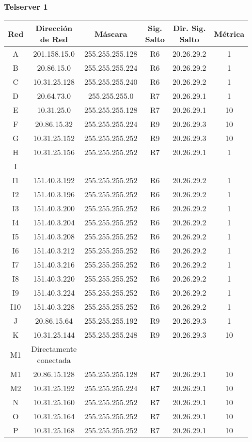 \subsubsection{Telserver 1}
\begin{tabular}{|c|c|c|c|c|c|}
	\hline
	Red & Dirección de Red & Máscara & Sig. Salto & Dir. Sig. Salto & Métrica \\
	\hline
	A & 201.158.15.0  & 255.255.255.128 & R6 & 20.26.29.2 & 1\\
	\hline	
	B & 20.86.15.0 & 255.255.255.224 & R6 & 20.26.29.2 & 1\\
	\hline
	C & 10.31.25.128 & 255.255.255.240 & R6 & 20.26.29.2 & 1\\
	\hline
	D & 20.64.73.0 & 255.255.255.0 & R7 & 20.26.29.1 & 1\\
	\hline
	E & 10.31.25.0 & 255.255.255.128 & R7 & 20.26.29.1 & 10\\
	\hline
	F & 20.86.15.32 & 255.255.255.224 & R9 & 20.26.29.3 & 10\\
	\hline
	G & 10.31.25.152 & 255.255.255.252 & R9 & 20.26.29.3 & 10\\
	\hline
	H & 10.31.25.156 & 255.255.255.252 &R7 & 20.26.29.1 & 1\\
	\hline
	I &  & & & &\\
	I1 & 151.40.3.192 & 255.255.255.252 & R6 & 20.26.29.2  & 1 \\
	I2 & 151.40.3.196 & 255.255.255.252 & R6 & 20.26.29.2 & 1 \\
 	I3 & 151.40.3.200 & 255.255.255.252 & R6 & 20.26.29.2 & 1 \\
 	I4 & 151.40.3.204 & 255.255.255.252 & R6 & 20.26.29.2 & 1 \\
 	I5 & 151.40.3.208 & 255.255.255.252 & R6 & 20.26.29.2 & 1 \\
 	I6 & 151.40.3.212 & 255.255.255.252 & R6 & 20.26.29.2 & 1 \\
 	I7 & 151.40.3.216 & 255.255.255.252 & R6 & 20.26.29.2 & 1 \\
 	I8 & 151.40.3.220 & 255.255.255.252 & R6 & 20.26.29.2 & 1 \\
 	I9 & 151.40.3.224 & 255.255.255.252 & R6 & 20.26.29.2 & 1 \\
 	I10 & 151.40.3.228 & 255.255.255.252 & R6 & 20.26.29.2 & 1 \\
	\hline
	J & 20.86.15.64 & 255.255.255.192 & R9 & 20.26.29.3 & 1\\
 	\hline
	K & 10.31.25.144 & 255.255.255.248 & R9 & 20.26.29.3 & 10\\
 	\hline
	M1 & Directamente conectada &&&&\\
	\hline
	M1 & 20.86.15.128 & 255.255.255.128 & R7 & 20.26.29.1 & 10\\
	\hline
	M2 & 10.31.25.192 & 255.255.255.224 & R7 & 20.26.29.1 & 10\\
	\hline
	N & 10.31.25.160 & 255.255.255.252 & R7 & 20.26.29.1 & 10\\
	\hline
	O & 10.31.25.164 & 255.255.255.252 & R7 & 20.26.29.1 & 10\\
	\hline
	P & 10.31.25.168 & 255.255.255.252 & R7 & 20.26.29.1 & 10\\
	\hline
\end{tabular}

